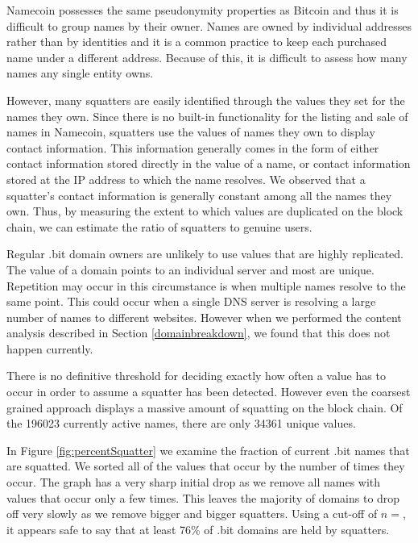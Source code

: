 Namecoin possesses the same pseudonymity properties as Bitcoin and thus it is difficult to group names by their owner. Names are owned by individual addresses rather than by identities and it is a common practice to keep each purchased name under a different address. Because of this, it is difficult to assess how many names any single entity owns. 

However, many squatters are easily identified through the values they set for the names they own. Since there is no built-in functionality for the listing and sale of names in Namecoin, squatters use the values of names they own to display contact information. This information generally comes in the form of either contact information stored directly in the value of a name, or contact information stored at the IP address to which the name resolves.  We observed that a squatter's contact information is generally constant among all the names they own. Thus, by measuring the extent to which values are duplicated on the block chain, we can estimate the ratio of squatters to genuine users.

Regular .bit domain owners are unlikely to use values that are highly replicated. The value of a domain points to an individual server and most are unique. Repetition may occur in this circumstance is when multiple names resolve to the same point. This could occur when a single DNS server is resolving a large number of names to different websites. However when we performed the content analysis described in Section \ref{domainbreakdown}, we found that this does not happen currently.

There is no definitive threshold for deciding exactly how often a value has to occur in order to assume a squatter has been detected. However even the coarsest grained approach displays a massive amount of squatting on the block chain. Of the 196023 currently active names, there are only 34361 unique values.

In Figure \ref{fig:percentSquatter} we examine the fraction of current .bit names that are squatted. We sorted all of the values that occur by the number of times they occur. 
The graph has a very sharp initial drop as we remove all names with values that occur only a few times. This leaves the majority of domains to drop off very slowly as we remove bigger and bigger squatters. Using a cut-off of $n=$, it appears safe to say that at least 76\% of .bit domains are held by squatters.

